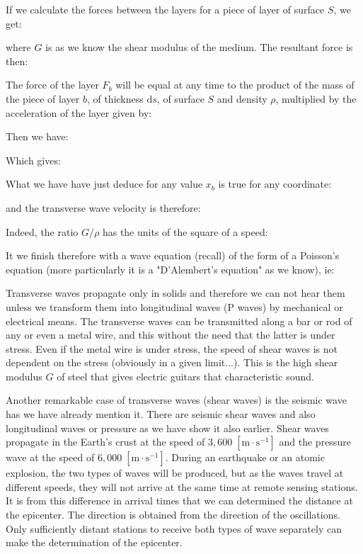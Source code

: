 	If we calculate the forces between the layers for a piece of layer of surface $S$, we get:
	
	where $G$ is as we know the shear modulus of the medium. The resultant force is then:
	
	The force of the layer $F_b$ will be equal at any time to the product of the mass of the piece of layer $b$, of thickness $\mathrm{d}s$, of surface $S$ and density $\rho$, multiplied by the acceleration of the layer given by:
	
	Then we have:
	
	Which gives:
	
	What we have have just deduce for any value $x_b$ is true for any coordinate:
	
	and the transverse wave velocity is therefore:
	
	Indeed, the ratio $G/\rho$ has the units of the square of a speed:
	
	It we finish therefore with a wave equation (recall) of the form of a Poisson's equation (more particularly it is a "D'Alembert's equation" as we know), ie:
	
	Transverse waves propagate only in solids and therefore we can not hear them unless we transform them into longitudinal waves (P waves) by mechanical or electrical means. The transverse waves can be transmitted along a bar or rod of any or even a metal wire, and this without the need that the latter is under stress. Even if the metal wire is under stress, the speed of shear waves is not dependent on the stress (obviously in a given limit...). This is the high shear modulus $G$ of steel that gives electric guitars that characteristic sound.
	
	Another remarkable case of transverse waves (shear waves) is the seismic wave has we have already mention it. There are seismic shear waves and also longitudinal waves or pressure as we have show it also earlier. Shear waves propagate in the Earth's crust at the speed of $3,600\; [\text{m}\cdot\text{s}^{-1}]$ and the pressure wave at the speed of $6,000\;[\text{m}\cdot \text{s}^{-1}]$. During an earthquake or an atomic explosion, the two types of waves will be produced, but as the waves travel at different speeds, they will not arrive at the same time at remote sensing stations. It is from this difference in arrival times that we can determined the distance at the epicenter. The direction is obtained from the direction of the oscillations. Only sufficiently distant stations to receive both types of wave separately can make the determination of the epicenter.
	
